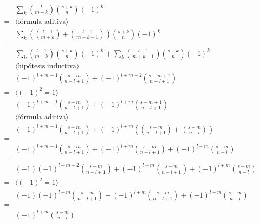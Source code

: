 \documentclass{article}
\begin{document}
\begin{align*}
  & \sum_k \binom{l}{m+k} \binom{s+k}{n} (-1)^k \\
  = & \langle \text{fórmula aditiva} \rangle \\
  & \sum_k \left(\binom{l-1}{m+k}+\binom{l-1}{m+k-1}\right) \binom{s+k}{n} (-1)^k \\
  = & \\
  & \sum_k \binom{l-1}{m+k} \binom{s+k}{n} (-1)^k + \sum_k \binom{l-1}{m+k-1} \binom{s+k}{n} (-1)^k \\
  = & \langle \text{hipótesis inductiva} \rangle \\
  & (-1)^{l+m-1} \binom{s-m}{n-l+1} + (-1)^{l+m-2} \binom{s-m+1}{n-l+1} \\
  = & \langle (-1)^2 = 1 \rangle \\
  & (-1)^{l+m-1} \binom{s-m}{n-l+1} + (-1)^{l+m} \binom{s-m+1}{n-l+1} \\
  = & \langle \text{fórmula aditiva} \rangle \\
  & (-1)^{l+m-1} \binom{s-m}{n-l+1} + (-1)^{l+m} \left( \binom{s-m}{n-l+1} + \binom{s-m}{n-l} \right) \\
  = & \\
  & (-1)^{l+m-1} \binom{s-m}{n-l+1} + (-1)^{l+m} \binom{s-m}{n-l+1} + (-1)^{l+m} \binom{s-m}{n-l} \\
  = & \\
  & (-1)(-1)^{l+m-2} \binom{s-m}{n-l+1} + (-1)^{l+m} \binom{s-m}{n-l+1} + (-1)^{l+m} \binom{s-m}{n-l} \\
  = & \langle (-1)^2 = 1 \rangle \\
  & (-1)(-1)^{l+m} \binom{s-m}{n-l+1} + (-1)^{l+m} \binom{s-m}{n-l+1} + (-1)^{l+m} \binom{s-m}{n-l} \\
  = & \\
  & (-1)^{l+m} \binom{s-m}{n-l} \\
\end{align*}

\newpage
\section{}
\end{document}
